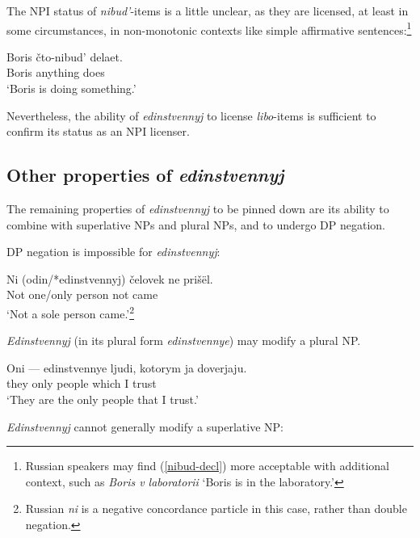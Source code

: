The NPI status of \textit{nibud'}-items is a little unclear, as they are licensed, at least in some circumstances, in non-monotonic contexts like simple affirmative sentences:\footnote{Russian speakers may find (\ref{nibud-decl}) more acceptable with additional context, such as \textit{Boris v laboratorii} `Boris is in the laboratory.'}

\begin{exe}
	\ex \label{nibud-decl} \gll Boris \v{c}to-nibud' delaet.\\
	Boris anything does\\
	\glt `Boris is doing something.'
\end{exe}

Nevertheless, the ability of \textit{edinstvennyj} to license \textit{libo}-items is sufficient to confirm its status as an NPI licenser.

\subsection{Other properties of \textit{edinstvennyj}}
The remaining properties of \textit{edinstvennyj} to be pinned down are its ability to combine with superlative NPs and plural NPs, and to undergo DP negation.

DP negation is impossible for \textit{edinstvennyj}:

\begin{exe}
	\ex \label{not-a-sole} \gll Ni (odin/*edinstvennyj) \v{c}elovek ne pri\v{s}\"{e}l.\\
	Not one/only person not came\\
	\glt `Not a sole person came.'\footnote{Russian \textit{ni} is a negative concordance particle in this case, rather than double negation.}
\end{exe}

\textit{Edinstvennyj} (in its plural form \textit{edinstvennye}) may modify a plural NP.

\begin{exe}
	\ex \label{plural-edin} \gll Oni --- edinstvennye ljudi, kotorym ja doverjaju.\\
	they {} only people which I trust\\
	\glt `They are the only people that I trust.'
\end{exe}

\textit{Edinstvennyj} cannot generally modify a superlative NP:

\begin{exe}
\end{exe}

